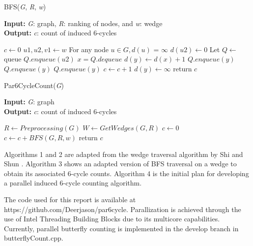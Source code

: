 \documentclass[11pt]{article}
\begin{document}
\begin{algorithm}[H]
\caption{BFS(\textit{G}, \textit{R}, \textit{w})}
\hspace*{\algorithmicindent} \textbf{Input:} \textit{G}: graph, \textit{R}: ranking of nodes, and \textit{w}: wedge \\
\hspace*{\algorithmicindent} \textbf{Output:} \textit{c}: count of induced 6-cycles
\begin{algorithmic}[1]
    \State $c \gets 0$
    \State $u1, u2, v1 \gets w$
    \State For any node $u \in G, d(u)$ = $\infty$
    \State $d(u2) \gets 0$
    \State Let $Q \gets$ queue
    \State $Q.enqueue(u2)$
        \State $x = Q.dequeue$
                \State $d(y) \gets d(x) + 1$
                        \State $Q.enqueue(y)$
                    \EndIf
                        \State $Q.enqueue(y)$
                    \EndIf
                        \State $Q.enqueue(y)$
                    \EndIf
                \Else
                        \State $c \gets c + 1$
                        \State $d(y) \gets \infty$
                    \EndIf
                \EndIf
            \EndIf
        \EndFor
    \EndWhile
    \State return $c$
\end{algorithmic}
\end{algorithm}

\begin{algorithm}[H]
\caption{Par6CycleCount(\textit{G})}
\hspace*{\algorithmicindent} \textbf{Input:} \textit{G}: graph \\
\hspace*{\algorithmicindent} \textbf{Output:} \textit{c}: count of induced 6-cycles
\begin{algorithmic}[1]
    \State $R \gets Preprocessing(G)$
    \State $W \gets GetWedges(G, R)$
    \State $c \gets $0
        \State $c \gets c + BFS(G, R, w)$
    \EndFor
    \State return $c$
\end{algorithmic}
\end{algorithm}

Algorithms 1 and 2 are adapted from the wedge traversal algorithm by Shi and Shun \cite{shi2019parallel}.
Algorithm 3 shows an adapted version of BFS traversal on a wedge to obtain its associated 6-cycle counts.
Algorithm 4 is the initial plan for developing a parallel induced 6-cycle counting algorithm.

The code used for this report is available at https://github.com/Deerjason/par6cycle.
Parallization is achieved through the use of Intel Threading Building Blocks due to its multicore capabilities.
Currently, parallel butterfly counting is implemented in the develop branch in butterflyCount.cpp.

{}

\end{document}
